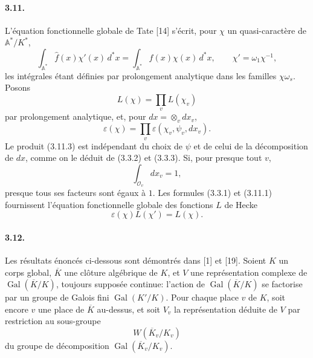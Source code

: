 \documentclass[10pt]{article}
\newcommand{\Gal}{\operatorname{Gal}}
\begin{document}
\paragraph{3.11.} L'équation fonctionnelle globale de Tate [14] s'écrit, pour \(\chi\) un quasi-caractère de \(\mathbb A^*/K^*\),
\[
\tag{3.11.1}
\int_{\mathbb A^*}\widehat f(x)\chi'(x)\,d^*x
=
\int_{\mathbb A^*}f(x)\chi(x)\,d^*x,
\qquad
\chi'=\omega_1\chi^{-1},
\]
les intégrales étant définies par prolongement analytique dans les familles \(\chi\omega_s\). Posons
\[
\tag{3.11.2}
L(\chi)=\prod_v L(\chi_v)
\]
par prolongement analytique, et, pour \(dx=\otimes_v dx_v\),
\[
\tag{3.11.3}
\varepsilon(\chi)=\prod_v\varepsilon(\chi_v,\psi_v,dx_v).
\]
Le produit (3.11.3) est indépendant du choix de \(\psi\) et de celui de la décomposition de \(dx\), comme on le déduit de (3.3.2) et (3.3.3). Si, pour presque tout \(v\),
\[
\int_{\mathcal O_v}dx_v=1,
\]
presque tous ses facteurs sont égaux à \(1\). Les formules (3.3.1) et (3.11.1) fournissent l'équation fonctionnelle globale des fonctions \(L\) de Hecke
\[
\tag{3.11.4}
\varepsilon(\chi)L(\chi')=L(\chi).
\]

\paragraph{3.12.} Les résultats énoncés ci-dessous sont démontrés dans [1] et [19]. Soient \(K\) un corps global, \(\overline K\) une clôture algébrique de \(K\), et \(V\) une représentation complexe de \(\Gal(\overline K/K)\), toujours supposée continue: l'action de \(\Gal(\overline K/K)\) se factorise par un groupe de Galois fini \(\Gal(K'/K)\). Pour chaque place \(v\) de \(K\), soit encore \(v\) une place de \(\overline K\) au-dessus, et soit \(V_v\) la représentation déduite de \(V\) par restriction au sous-groupe
\[
W(\overline K_v/K_v)
\]
du groupe de décomposition \(\Gal(\overline K_v/K_v)\).
\end{document}
